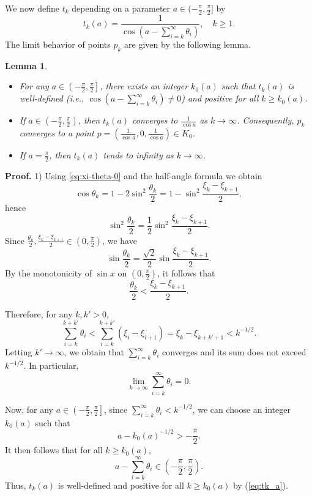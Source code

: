 \documentclass[12pt]{article}
\newtheorem{lemma}{Lemma}
\begin{document}
We now define $t_k$ depending on a parameter $a \in (-\frac{\pi}{2},\frac{\pi}{2}]$ by 
\begin{equation}\label{eq:tk_a}
t_k(a) = \frac{1}{\cos \left(a - \sum_{i=k}^\infty \theta_i \right)}, \quad k \geq 1.
\end{equation}
The limit behavior of points $p_k$ are given by the following lemma.
\begin{lemma}\label{lem:angle_conv_c}
  \begin{itemize}
      \item[1)] 
      For any $a \in \left(-\frac{\pi}{2}, \frac{\pi}{2}\right]$, there exists an integer $k_0(a)$ such that $t_k(a)$ is well-defined 
      (i.e., $\cos \left(a - \sum_{i=k}^\infty \theta_i \right) \neq 0$)
      and positive for all $k \geq k_0(a)$.
      \item[2)] 
      If $a \in \left(-\frac{\pi}{2}, \frac{\pi}{2}\right)$, then $t_k(a)$ converges to $\frac{1}{\cos a}$ as $k \to \infty$. Consequently, $p_k$ converges to a point $p=(\frac{1}{\cos a}, 0, \frac{1}{\cos a}) \in K_0$.
      \item[3)] 
      If $a = \frac{\pi}{2}$, then $t_k(a)$ tends to infinity as $k \to \infty$.
  \end{itemize}
\end{lemma}
\textbf{Proof.}
1)
Using \eqref{eq:xi-theta-0} and the half-angle formula we obtain
$$
\cos \theta_k
=
1 - 2 \sin^2 \frac{\theta_k}{2} 
= 1 - \sin^2 \frac{\xi_k -\xi_{k+1}}{2},
$$
hence
$$
\sin^2 \frac{\theta_k}{2} = \frac{1}{2}\sin^2 \frac{\xi_k -\xi_{k+1}}{2}.
$$
Since
$\frac{\theta_k}{2}, \frac{\xi_k - \xi_{k+1}}{2}\in (0,\frac{\pi}{2})$,  we have
\begin{equation}\label{eq:xi-theta-1}
\sin \frac{\theta_k}{2}= \frac{\sqrt{2}}{2} \sin \frac{\xi_k - \xi_{k+1}}{2}.
\end{equation}
By the monotonicity of $\sin x$ on $(0,\frac{\pi}{2})$, it follows that
$$
\frac{\theta_k}{2} < \frac{\xi_k - \xi_{k+1}}{2}.
$$

Therefore, for any $k,k'>0$,
$$
\sum_{i=k}^{k+k'} \theta_i < \sum_{i=k}^{k+k'} (\xi_i - \xi_{i+1}) = \xi_k - \xi_{k+k'+1} < k^{-1/2}.
$$
Letting $k'\to\infty$, we obtain that $\sum_{i=k}^\infty \theta_i$ converges and its sum does not exceed $k^{-1/2}$. 
In particular,
\begin{equation}\label{eq:theta-sum-limit}
\lim_{k\to\infty}\sum_{i=k}^\infty \theta_i = 0.
\end{equation}

Now, for any $a \in \left(-\frac{\pi}{2}, \frac{\pi}{2}\right]$, since $\sum_{i=k}^\infty \theta_i < k^{-1/2}$, we can choose an integer $k_0(a)$ such that 
$$
a - k_0(a)^{-1/2} >  -\frac{\pi}{2}.
$$ 
It then follows that for all $k \geq k_0(a)$, 
$$
a-\sum_{i=k}^\infty \theta_i \in (-\frac{\pi}{2}, \frac{\pi}{2}).
$$
Thus, $t_k(a)$ is well-defined and positive for all $k \geq k_0(a)$ by (\ref{eq:tk_a}).
\end{document}

